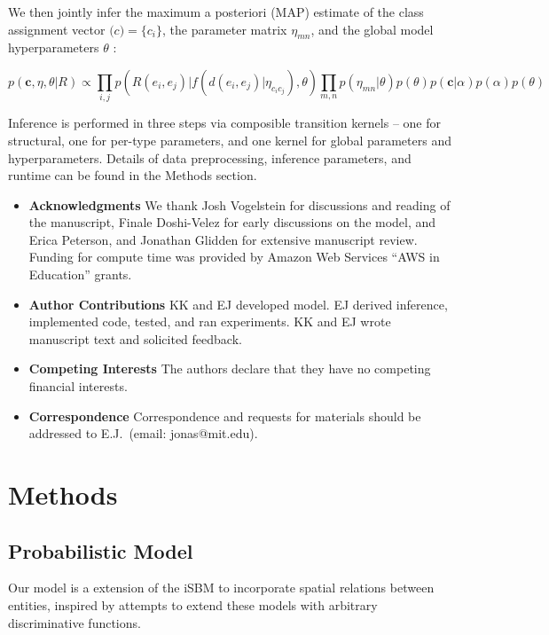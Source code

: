 \documentclass{article}
\renewcommand{\vec}[1]{\mathbf{#1}}
\begin{document}
We then jointly infer the maximum a posteriori (MAP) estimate of the
class assignment vector $\vec(c) = \{c_i\}$, the parameter matrix $\eta_{mn}$, and
the global model hyperparameters $\theta$ :

\begin{equation}
  p(\vec{c}, \eta, \theta | R ) \propto \prod_{i, j} p(R(e_i, e_j) | f(d(e_i, e_j) | \eta_{c_ic_j}), \theta) \prod_{m, n} p(\eta_{mn} | \theta)  p(\theta) p(\vec{c} | \alpha) p(\alpha) p(\theta)
\end{equation}

Inference is performed in three steps via composible transition 
kernels -- one for structural, one for per-type parameters, and
one kernel for global parameters and hyperparameters. Details
of data preprocessing, inference parameters, and runtime can
be found in the Methods section. 

\printbibliography

\begin{itemize}

 \item \textbf{Acknowledgments} We thank Josh Vogelstein for discussions and reading of the manuscript, Finale Doshi-Velez for early discussions on the model, and Erica Peterson, and Jonathan Glidden for extensive manuscript review. Funding for compute time was provided by Amazon Web Services ``AWS in Education'' grants. 
\item \textbf{Author Contributions} KK and EJ developed model. EJ derived inference, implemented code, tested, and ran experiments. KK and EJ wrote manuscript text and solicited feedback. 
 \item \textbf{Competing Interests} The authors declare that they have no
competing financial interests.
 \item \textbf{Correspondence} Correspondence and requests for materials
should be addressed to E.J.~(email: jonas@mit.edu).
\end{itemize}

\newpage
\section{Methods }

\subsection{Probabilistic Model}

Our model is a extension of the iSBM
\autocite{Kemp2006a,Xu2006} to incorporate spatial relations between entities,
inspired by attempts to extend these models with arbitrary
discriminative functions\autocite{Murphy2012}.
\end{document}
